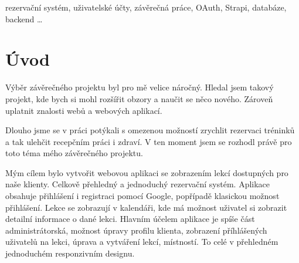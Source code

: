 \documentclass[12pt, a4paper,
openright
]{report}
\begin{document}
	
	\vspace{18pt}
	
	
	\noindent rezervační systém, uživatelské účty, závěrečná práce, OAuth, Strapi, databáze, backend \dots 
	
	\vspace{600pt}


	
	\tableofcontents %


	\chapter*{Úvod}

Výběr závěrečného projektu byl pro mě velice náročný. Hledal jsem takový projekt, kde bych si mohl rozšířit obzory a naučit se něco nového. Zároveň uplatnit znalosti webů a webových aplikací.

 Dlouho jsme se v práci potýkali s omezenou možností zrychlit rezervaci tréninků a tak ulehčit recepčním práci i zdraví. V ten moment jsem se rozhodl právě pro toto téma mého závěrečného projektu.

 Mým cílem bylo vytvořit webovou aplikaci se zobrazením lekcí dostupných pro naše klienty. Celkově přehledný a jednoduchý rezervační systém. Aplikace obsahuje přihlášení i registraci pomocí Google, popřípadě klasickou možnost přihlášení. Lekce se zobrazují v kalendáři, kde má možnost uživatel si zobrazit detailní informace o dané lekci. Hlavním účelem aplikace je spíše část administrátorská, možnost úpravy profilu klienta, zobrazení příhlášených uživatelů na lekci, úprava a vytváření lekcí, místností. To celé v přehledném jednoduchém responzivním designu.
\end{document}
